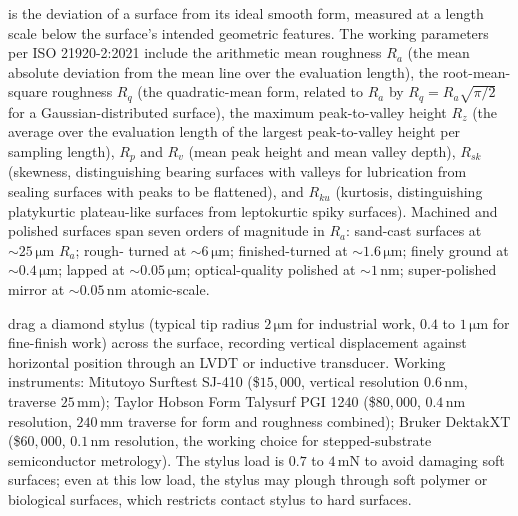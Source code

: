  is the deviation of a surface from its
ideal smooth form, measured at a length scale below the surface's
intended geometric features. The working parameters per
ISO 21920-2:2021 include the arithmetic mean roughness $R_{a}$
(the mean absolute deviation from the mean line over the
evaluation length), the root-mean-square roughness $R_{q}$ (the
quadratic-mean form, related to $R_{a}$ by $R_{q} = R_{a}
\sqrt{\pi/2}$ for a Gaussian-distributed surface), the maximum
peak-to-valley height $R_{z}$ (the average over the evaluation
length of the largest peak-to-valley height per sampling length),
$R_{p}$ and $R_{v}$ (mean peak height and mean valley depth), $R_{sk}$
(skewness, distinguishing bearing surfaces with valleys for
lubrication from sealing surfaces with peaks to be flattened),
and $R_{ku}$ (kurtosis, distinguishing platykurtic
plateau-like surfaces from leptokurtic spiky surfaces). Machined
and polished surfaces span seven orders of magnitude in $R_{a}$:
sand-cast surfaces at $\sim 25\,\si{\micro\meter}$ $R_{a}$; rough-
turned at $\sim 6\,\si{\micro\meter}$; finished-turned at
$\sim 1.6\,\si{\micro\meter}$; finely ground at $\sim 0.4\,\si{
\micro\meter}$; lapped at $\sim 0.05\,\si{\micro\meter}$;
optical-quality polished at $\sim 1\,\si{\nano\meter}$;
super-polished mirror at $\sim 0.05\,\si{\nano\meter}$ atomic-scale.

 drag a diamond stylus
(typical tip radius $2\,\si{\micro\meter}$ for industrial work,
$0.4$ to $1\,\si{\micro\meter}$ for fine-finish work) across the
surface, recording vertical displacement against horizontal
position through an LVDT or inductive transducer. Working
instruments: Mitutoyo Surftest SJ-410 (\$$15{,}000$, vertical
resolution $0.6\,\si{\nano\meter}$, traverse $25\,\si{\milli
\meter}$); Taylor Hobson Form Talysurf PGI 1240 (\$$80{,}000$,
$0.4\,\si{\nano\meter}$ resolution, $240\,\si{\milli\meter}$
traverse for form and roughness combined); Bruker DektakXT
(\$$60{,}000$, $0.1\,\si{\nano\meter}$ resolution, the working
choice for stepped-substrate semiconductor metrology). The stylus
load is $0.7$ to $4\,\si{\milli\newton}$ to avoid damaging
soft surfaces; even at this low load, the stylus may plough
through soft polymer or biological surfaces, which restricts
contact stylus to hard surfaces.

